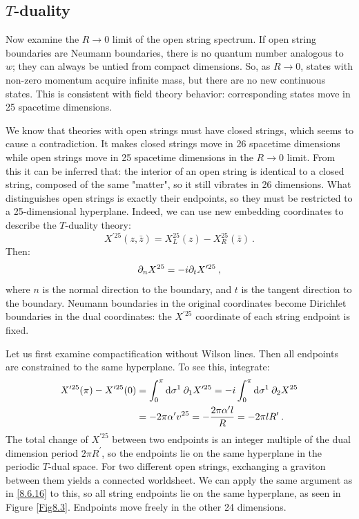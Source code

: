 \subsection*{$T$-duality}

Now examine the $R \rightarrow 0$ limit of the open string spectrum. If open string boundaries are Neumann boundaries, there is no quantum number analogous to $w$; they can always be untied from compact dimensions. 
So, as $R \rightarrow 0$, states with non-zero momentum acquire infinite mass, but there are no new continuous states. 
This is consistent with field theory behavior: corresponding states move in 25 spacetime dimensions.

We know that theories with open strings must have closed strings, which seems to cause a contradiction. It makes closed strings move in 26 spacetime dimensions while open strings move in 25 spacetime dimensions in the $R \rightarrow 0$ limit. 
From this it can be inferred that: the interior of an open string is identical to a closed string, composed of the same "matter", so it still vibrates in 26 dimensions. What distinguishes open strings is exactly their endpoints, 
so they must be restricted to a 25-dimensional hyperplane. 
Indeed, we can use new embedding coordinates to describe the $T$-duality theory:
\begin{equation}
	X^{\prime 25}(z, \bar{z})=X_{L}^{25}(z)-X_{R}^{25}(\bar{z}) \:. \label{8.6.14}
\end{equation}
Then:
\begin{equation}
	\partial_{n} X^{25}=-i \partial_{t} X^{\prime 25} \:, \label{8.6.15}
\end{equation}
where $n$ is the normal direction to the boundary, and $t$ is the tangent direction to the boundary. 
Neumann boundaries in the original coordinates become Dirichlet boundaries in the dual coordinates: the $X^{\prime 25}$ coordinate of each string endpoint is fixed. 

Let us first examine compactification without Wilson lines. Then all endpoints are constrained to the same hyperplane. To see this, integrate:
\begin{align}
	X^{\prime 25}(\pi)-X^{\prime 25}(0) &= \int_{0}^{\pi} \mathrm{d} \sigma^{1}\: \partial_{1} X^{\prime 25}
	= -i \int_{0}^{\pi} \mathrm{d} \sigma^{1}\: \partial_{2} X^{25} \nonumber \\
	&= -2 \pi \alpha^{\prime} v^{25}
	= -\frac{2 \pi \alpha^{\prime} l}{R}=-2 \pi l R^{\prime} \:. \label{8.6.16}
\end{align}
The total change of $X^{\prime 25}$ between two endpoints is an integer multiple of the dual dimension period $2 \pi R^{\prime}$, so the endpoints lie on the same hyperplane in the periodic $T$-dual space. 
For two different open strings, exchanging a graviton between them yields a connected worldsheet. We can apply the same argument as in \eqref{8.6.16} to this, so all string endpoints lie on the same hyperplane, 
as seen in Figure \ref{Fig8.3}. Endpoints move freely in the other 24 dimensions.

